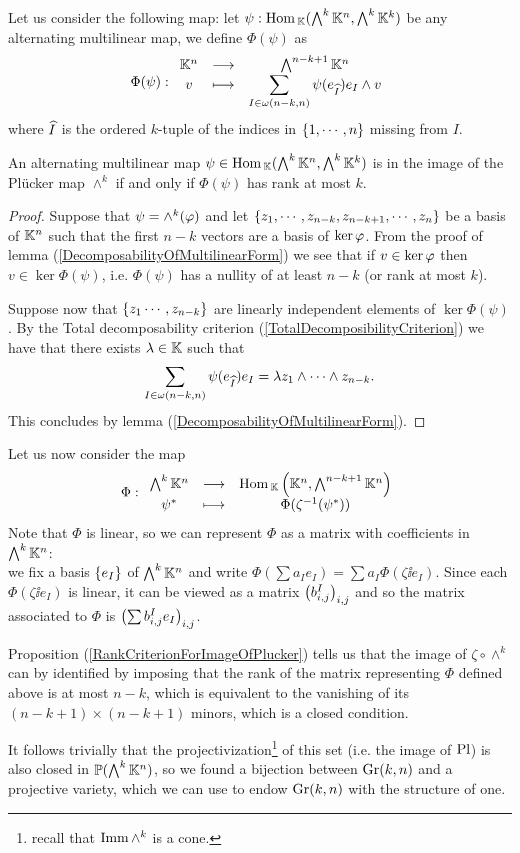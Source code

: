 \noindent Let us consider the following map: let $\psi:\mathrm{Hom}\,_{\mathbb{K}}(\bigwedge^k\mathbb{K}^n,\bigwedge^k\mathbb{K}^k)$ be any alternating multilinear map, we define $\Phi(\psi)$ as
\[\Phi(\psi):\begin{array}{ccc} {\mathbb{K}^n} & \longrightarrow & {\bigwedge^{n-k+1}\mathbb{K}^n}\\ {v} & \longmapsto & {\displaystyle\sum_{I\in \omega(n-k,n)}\psi(e_{\widehat{I}})e_I\wedge v} \end{array}\]
where $\widehat{I}$ is the ordered $k$-tuple of the indices in $\left\{{1,\cdots, n}\right\}$ missing from $I$.



\begin{proposition}\label{RankCriterionForImageOfPlucker}
An alternating multilinear map $\psi\in \mathrm{Hom}\,_{\mathbb{K}}(\bigwedge^k\mathbb{K}^n,\bigwedge^k\mathbb{K}^k)$ is in the image of the Pl\"ucker map $\wedge^k$ if and only if $\Phi(\psi)$ has rank at most $k$.
\end{proposition}
\begin{proof}
Suppose that $\psi=\wedge^k(\varphi)$ and let $\left\{{z_1,\cdots, z_{n-k},z_{n-k+1},\cdots, z_{n}}\right\}$ be a basis of $\mathbb{K}^n$ such that the first $n-k$ vectors are a basis of $\ker \varphi$. From the proof of lemma (\ref{DecomposabilityOfMultilinearForm}) we see that if $v\in \ker \varphi$ then $v\in \ker \Phi(\psi)$, i.e. $\Phi(\psi)$ has a nullity of at least $n-k$ (or rank at most $k$).
\medskip

\noindent
Suppose now that $\left\{{z_1\cdots, z_{n-k}}\right\}$ are linearly independent elements of $\ker \Phi(\psi)$. By the Total decomposability criterion (\ref{TotalDecomposibilityCriterion}) we have that there exists $\lambda\in\mathbb{K}$ such that
\[\sum_{I\in \omega(n-k,n)}\psi(e_{\widehat{I}})e_I=\lambda z_1\wedge\cdots \wedge z_{n-k}.\]This concludes by lemma (\ref{DecomposabilityOfMultilinearForm}).
\end{proof}

\noindent Let us now consider the map
\[\Phi:\begin{array}{ccc} {\bigwedge^k\mathbb{K}^n} & \longrightarrow & { \mathrm{Hom}\,_{\mathbb{K}}\left({\mathbb{K}^n,\bigwedge^{n-k+1}\mathbb{K}^n}\right)}\\ {\psi^\ast} & \longmapsto & {\Phi(\zeta^{-1}(\psi^\ast))} \end{array}\]
Note that $\Phi$ is linear, so we can represent $\Phi$ as a matrix with coefficients in $\bigwedge^k\mathbb{K}^n$:\\
we fix a basis $\left\{{e_I}\right\}$ of $\bigwedge^k\mathbb{K}^n$ and write $\Phi(\sum a_I e_I)=\sum a_I \Phi(\zeta\ii e_I)$. Since each $\Phi(\zeta\ii e_I)$ is linear, it can be viewed as a matrix $\left({b_{i,j}^I}\right)_{i,j}$ and so the matrix associated to $\Phi$ is $\left({\sum b_{i,j}^I e_I}\right)_{i,j}$.
\bigskip

\noindent Proposition (\ref{RankCriterionForImageOfPlucker}) tells us that the image of $\zeta\circ\wedge^k$ can by identified by imposing that the rank of the matrix representing $\Phi$ defined above is at most $n-k$, which is equivalent to the vanishing of its $(n-k+1)\times (n-k+1)$ minors, which is a closed condition.

It follows trivially that the projectivization\footnote{recall that $\mathrm{Imm}\, \wedge^k$ is a cone.} of this set (i.e. the image of $\mathrm{Pl}$) is also closed in $\mathbb{P}(\bigwedge^k\mathbb{K}^n)$, so we found a bijection between $\mathrm{Gr}(k,n)$ and a projective variety, which we can use to endow $\mathrm{Gr}(k,n)$ with the structure of one.













